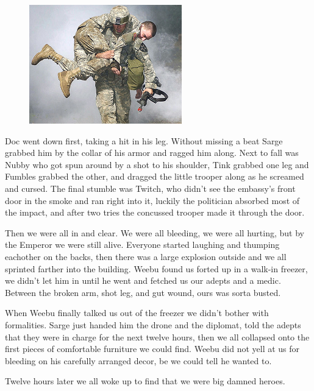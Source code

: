 \begin{figure}
	\begin{center}
		\includegraphics[width=\figwidth]{pics/10/73.png}
	\end{center}
\end{figure}
Doc went down first, taking a hit in his leg. 
Without missing a beat Sarge grabbed him by the collar of his armor and ragged him along. 
Next to fall was Nubby who got spun around by a shot to his shoulder, Tink grabbed one leg and Fumbles grabbed the other, and dragged the little trooper along as he screamed and cursed. 
The final stumble was Twitch, who didn’t see the embassy’s front door in the smoke and ran right into it, luckily the politician absorbed most of the impact, and after two tries the concussed trooper made it through the door.

Then we were all in and clear. 
We were all bleeding, we were all hurting, but by the Emperor we were still alive. 
Everyone started laughing and thumping eachother on the backs, then there was a large explosion outside and we all sprinted farther into the building. 
Weebu found us forted up in a walk-in freezer, we didn’t let him in until he went and fetched us our adepts and a medic. 
Between the broken arm, shot leg, and gut wound, ours was sorta busted.

When Weebu finally talked us out of the freezer we didn’t bother with formalities. 
Sarge just handed him the drone and the diplomat, told the adepts that they were in charge for the next twelve hours, then we all collapsed onto the first pieces of comfortable furniture we could find. 
Weebu did not yell at us for bleeding on his carefully arranged decor, be we could tell he wanted to.

Twelve hours later we all woke up to find that we were big damned heroes.

